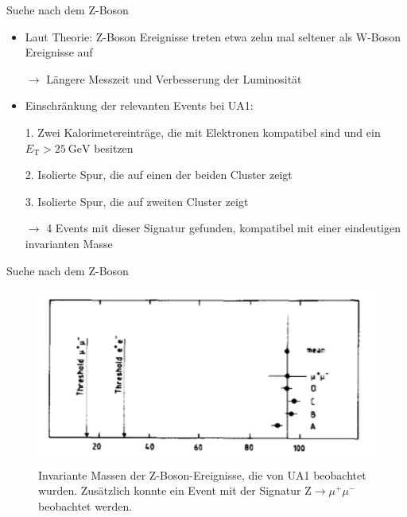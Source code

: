 \documentclass[aspectratio=1610, professionalfonts, 10pt]{beamer}
\begin{document}
\begin{frame}{Suche nach dem Z-Boson}
			\begin{itemize}
				\setlength\itemsep{0.5em}
				\item Laut Theorie: Z-Boson Ereignisse treten etwa zehn mal seltener als W-Boson Ereignisse auf
				\item[$\rightarrow$] Längere Messzeit und Verbesserung der Luminosität
				\item Einschränkung der relevanten Events bei UA1:
				\item[1.] Zwei Kalorimetereinträge, die mit Elektronen kompatibel sind und ein $E_\text{T} > \SI{25}{\giga\electronvolt}$ besitzen
				\item[2.] Isolierte Spur, die auf einen der beiden Cluster zeigt
				\item[3.] Isolierte Spur, die auf zweiten Cluster zeigt
				\item[$\rightarrow$] 4 Events mit dieser Signatur gefunden, kompatibel mit einer eindeutigen invarianten Masse
			\end{itemize}
\end{frame}


\begin{frame}{Suche nach dem Z-Boson}
			\begin{figure}
	  			\centering
				\includegraphics[width=0.85\linewidth]{Images/Screenshot_2018-12-05_15-29-02.png}
				\caption{Invariante Massen der Z-Boson-Ereignisse, die von UA1 beobachtet wurden. \cite{doi:10.1142/9789814644150_0006} Zusätzlich konnte ein Event mit der Signatur $\text{Z} \rightarrow \mu^+ \mu^-$ beobachtet werden.}
	  			\label{fig:sad}
			\end{figure}
\end{frame}
\end{document}
